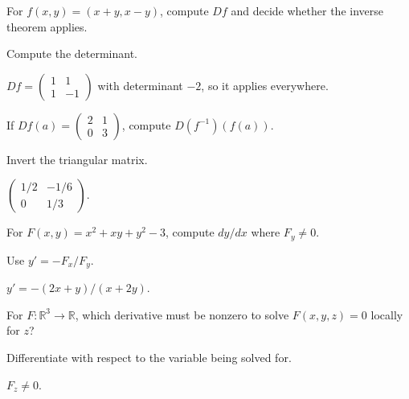 \begin{exercise}\label{exr:ii09-expand-01}
For \(f(x,y)=(x+y,x-y)\), compute \(Df\) and decide whether the inverse theorem applies.
\end{exercise}
\begin{hint}
Compute the determinant.
\end{hint}
\begin{solution}
\(Df=\begin{pmatrix}1&1\\1&-1\end{pmatrix}\) with determinant \(-2\), so it applies everywhere.
\end{solution}

\begin{exercise}\label{exr:ii09-expand-02}
If \(Df(a)=\begin{pmatrix}2&1\\0&3\end{pmatrix}\), compute \(D(f^{-1})(f(a))\).
\end{exercise}
\begin{hint}
Invert the triangular matrix.
\end{hint}
\begin{solution}
\(\begin{pmatrix}1/2&-1/6\\0&1/3\end{pmatrix}\).
\end{solution}

\begin{exercise}\label{exr:ii09-expand-03}
For \(F(x,y)=x^2+xy+y^2-3\), compute \(dy/dx\) where \(F_y\ne0\).
\end{exercise}
\begin{hint}
Use \(y'=-F_x/F_y\).
\end{hint}
\begin{solution}
\(y'=-(2x+y)/(x+2y)\).
\end{solution}

\begin{exercise}\label{exr:ii09-expand-04}
For \(F:\mathbb R^3\to\mathbb R\), which derivative must be nonzero to solve \(F(x,y,z)=0\) locally for \(z\)?
\end{exercise}
\begin{hint}
Differentiate with respect to the variable being solved for.
\end{hint}
\begin{solution}
\(F_z\ne0\).
\end{solution}

